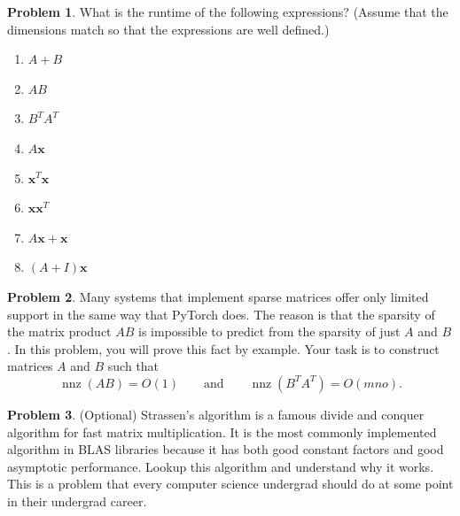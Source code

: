 \documentclass[10pt]{article}
\theoremstyle{definition}
\newtheorem{problem}{Problem}
\DeclareMathOperator{\nnz}{nnz}
\newcommand{\trans}[1]{{#1}^{T}}
\newcommand{\x}{\mathbf x}
\begin{document}
\begin{problem}
    What is the runtime of the following expressions?
    (Assume that the dimensions match so that the expressions are well defined.)

    \begin{enumerate}
        \item
            $A + B$
            \vspace{1in}
        \item
            $AB$
            \vspace{1in}
        \item
            $\trans B \trans A$
            \vspace{1in}
        \item
            $A\x$
            \vspace{1in}
        \item
            $\trans \x \x$
            \vspace{1in}
        \item
            $\x\trans \x$
            \vspace{1in}
        \item
            $A\x + \x$
            \vspace{1in}
        \item
            $(A+I)\x$
            \vspace{1in}
    \end{enumerate}
\end{problem}

\newpage
\begin{problem}
    Many systems that implement sparse matrices offer only limited support in the same way that PyTorch does.
    The reason is that the sparsity of the matrix product $AB$ is impossible to predict from the sparsity of just $A$ and $B$.
    In this problem, you will prove this fact by example.
    Your task is to construct matrices $A$ and $B$ such that
    \begin{equation}
        \nnz(AB) = O(1)
        \qquad
        \text{and}
        \qquad
        \nnz(\trans B \trans A) = O(mno)
        .
    \end{equation}
    \vspace{3in}
\end{problem}

\begin{problem}
    (Optional)
    Strassen's algorithm is a famous divide and conquer algorithm for fast matrix multiplication.
    It is the most commonly implemented algorithm in BLAS libraries because it has both good constant factors and good asymptotic performance.
    Lookup this algorithm and understand why it works.
    This is a problem that every computer science undergrad should do at some point in their undergrad career.
    \vspace{4in}
\end{problem}
\end{document}
